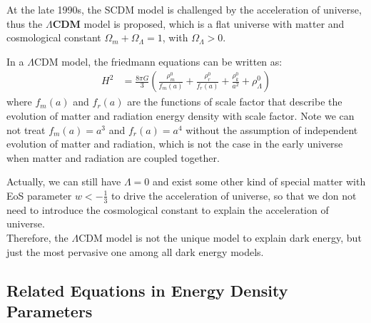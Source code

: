 \bigskip \noindent
At the late 1990s, the SCDM model is challenged by the acceleration of universe, thus the \textbf{$\Lambda$CDM} model is proposed, which is a flat universe with matter and cosmological constant $\Omega_{m} + \Omega_{\Lambda} = 1$, with $\Omega_{\Lambda} > 0$.

\begin{theory}
    In a $\Lambda$CDM model, the friedmann equations can be written as:
    \begin{align*}
        H^2 &= \frac{8\pi G}{3} \left( \frac{\rho_{m}^0}{f_m(a)} +  \frac{\rho_{r}^0}{f_r(a)} + \frac{\rho_{k}^0}{a^2} + \rho_{\Lambda}^0 \right)
    \end{align*}
    where $f_m(a)$ and $f_r(a)$ are the functions of scale factor that describe the evolution of matter and radiation energy density with scale factor. Note we can not treat $f_m(a) = a^3$ and $f_r(a) = a^4$ without the assumption of independent evolution of matter and radiation, which is not the case in the early universe when matter and radiation are coupled together. \\
\end{theory}

\bigskip \noindent
\begin{importantnote}
    Actually, we can still have $\Lambda = 0$ and exist some other kind of special matter with EoS parameter $w < -\frac{1}{3}$ to drive the acceleration of universe, so that we don not need to introduce the cosmological constant to explain the acceleration of universe. \\
    
    Therefore, the $\Lambda$CDM model is not the unique model to explain dark energy, but just the most pervasive one among all dark energy models.
\end{importantnote}

\clearpage
\subsection{Related Equations in Energy Density Parameters}

